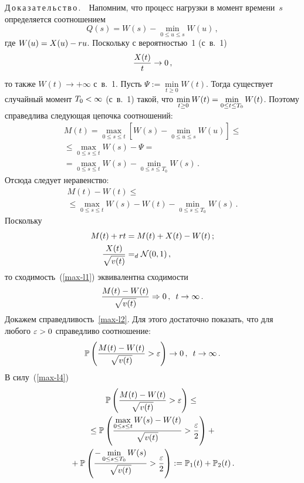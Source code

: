 \begin{multicols}{2}
\noindent
Д\,о\,к\,а\,з\,а\,т\,е\,л\,ь\,с\,т\,в\,о\,.\ \ Напомним, что 
процесс нагрузки в момент времени~$s$ определяется соотношением
$$
Q(s)=W(s)-\min\limits_{0\leq u \leq s}W(u)\,,
$$
где $W(u)= X(u)\hm-ru$.
Поскольку с вероятностью~1 (с~в.~1)
$$
\displaystyle\frac{\displaystyle X(t)\mathstrut}{\displaystyle t\mathstrut} \to 0\,,
$$
то также $W(t) \to +\infty$ с~в.~1. Пусть $\Psi:=\min\limits_{t \geq
0}{W(t)}$. Тогда существует случайный момент  $T_0\hm<\infty$  (с~в.~1)
такой, что $\min\limits_{t \geq 0}W(t)\hm=\min\limits_{0 \leq t \leq
T_0}W(t)$. Поэтому справедлива следующая цепочка соотношений:
\begin{multline*}
M(t)=\displaystyle\max\limits_{0 \leq s \leq t}\left[ W(s)-\min\limits_{0 \leq u \leq s}W(u)\right]\leq{}\\
{}\leq\displaystyle \max\limits_{0 \leq s \leq t} W(s)- \Psi={}\\
{}= \displaystyle\max\limits_{0 \leq s \leq t} W(s)- \min\limits_{0 \leq s \leq T_0} W(s)\,.
\end{multline*}
Отсюда следует  неравенство:
\begin{multline}
M(t)-W(t) \leq{}\\
{}\leq  \max\limits_{0 \leq s \leq t} W(s)-W(t)- 
\min\limits_{0 \leq s \leq T_0} W(s)\,. 
\label{max-l4}
\end{multline}
Поскольку
\begin{align*}
M(t)+rt&=M(t)+X(t)-W(t)\,;\\
\displaystyle\frac{\displaystyle X(t)\mathstrut}{\displaystyle \sqrt{v(t)}\mathstrut}&=_d \mathcal{N}(0,1)\,,
\end{align*}
то сходимость~(\ref{max-l1}) эквивалентна сходимости
\begin{equation}
\displaystyle\frac{\displaystyle M(t)-W(t)\mathstrut}{\displaystyle \sqrt{v(t)}\mathstrut}  \Rightarrow 0\,, \enskip t \to
\infty\,.
\label{max-l2}
\end{equation}
Докажем справедливость~\eqref{max-l2}.
Для этого достаточно показать, что для любого $\varepsilon\hm>0$ справедливо соотношение:
\begin{equation}
\mathbb{P} \left(\displaystyle\frac{\displaystyle M(t)-W(t)\mathstrut}{\displaystyle \sqrt{v(t)}\mathstrut}> \varepsilon  \right) \to 0\,,
\enskip t \to \infty\,. 
\label{max-l3}
\end{equation}
В силу~(\ref{max-l4})
\begin{multline*}
\Pu \left(\fr{M(t)-W(t)}{\sqrt{v(t)}}> \varepsilon  \right) \leq{}\\
{}\leq 
\Pu \left(\fr{\max\limits_{0 \leq s \leq t}W(s)-W(t)}{\sqrt{v(t)}}> 
\fr{\varepsilon}{2}  \right)+{}
\\{} + \Pu \left(\fr{-\min\limits_{0 \leq s \leq T_0}W(s)}{\sqrt{v(t)}}> 
\fr{\varepsilon}{2}  \right):=\Pu_1(t)+\Pu_2(t)\,.

\end{multline*}
\end{multicols}
